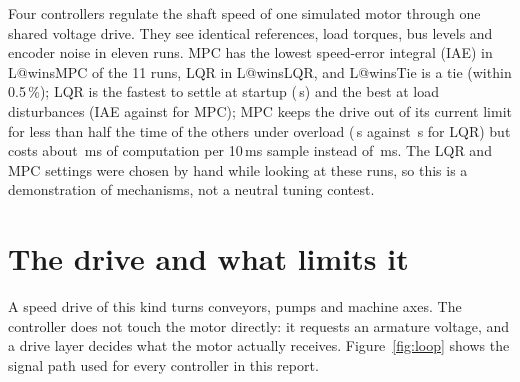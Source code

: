 \documentclass[10pt,a4paper]{article}
\makeatletter
\newcommand{\Lw}[1]{\csname L@#1\endcsname}
\makeatother
\begin{document}
\vspace*{3.3cm}

\begin{finding}[title=Summary]
Four controllers regulate the shaft speed of one simulated motor through one shared voltage drive.
They see identical references, load torques, bus levels and encoder noise in eleven runs.
MPC has the lowest speed-error integral (IAE) in \Lw{winsMPC} of the 11 runs, LQR in \Lw{winsLQR}, and \Lw{winsTie} is a tie (within 0.5\,\%);
LQR is the fastest to settle at startup (\,s) and the best at
load disturbances (IAE  against  for MPC);
MPC keeps the drive out of its current limit for less than half the time of the others under
overload (\,s against \,s for LQR) but
costs about \,ms of computation per 10\,ms sample instead of
\,ms.
The LQR and MPC settings were chosen by hand while looking at these runs, so this is a
demonstration of mechanisms, not a neutral tuning contest.
\end{finding}

\tableofcontents

\section{The drive and what limits it}
A speed drive of this kind turns conveyors, pumps and machine axes. The controller does not touch the
motor directly: it requests an armature voltage, and a drive layer decides what the motor actually
receives. Figure~\ref{fig:loop} shows the signal path used for every controller in this report.
\end{document}

